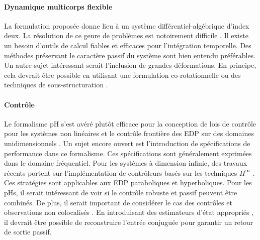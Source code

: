 \paragraph{Dynamique multicorps flexible}
La formulation proposée donne lieu à un système différentiel-algébrique d'index deux. La résolution de ce genre de problèmes est notoirement difficile \cite{brenan1995dae}. Il existe un besoin d'outils de calcul fiables et efficaces pour l'intégration temporelle. Des méthodes préservant le caractère passif du système sont bien entendu préférables. \\ Un autre sujet intéressant serait l'inclusion de grandes déformations. En principe, cela devrait être possible en utilisant une formulation co-rotationnelle ou des techniques de sous-structuration \cite{wu1988substructuring}.

\paragraph{Contrôle}
Le formalisme pH s'est avéré plutôt efficace pour la conception de lois de contrôle pour les systèmes non linéaires \cite{ortega2004survey} et le contrôle frontière des EDP sur des domaines unidimensionnels \cite{macchelli2020exponential}. Un sujet encore ouvert est l'introduction de spécifications de performance dans ce formalisme. Ces spécifications sont généralement exprimées dans le domaine fréquentiel. Pour les systèmes à dimension infinie, des travaux récents portent sur l'implémentation de contrôleurs basés sur les techniques $ H^\infty $ \cite{apkarian2018structured,apkarian2020bd}. Ces stratégies sont applicables aux EDP paraboliques et hyperboliques. Pour les pHs, il serait intéressant de voir si le contrôle robuste et  passif peuvent être combinés. De plus, il serait important de considérer le cas des contrôles et observations non colocalisés \cite{cardoso2016}. En introduisant des estimateurs d'état appropriés \cite{yaghmaei2019}, il devrait être possible de reconstruire l'entrée conjuguée pour garantir un retour de sortie passif.

